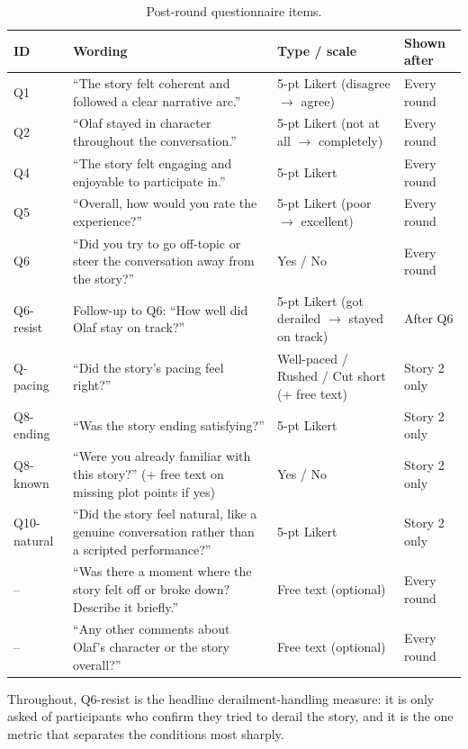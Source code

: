 \documentclass[10pt]{article}
\begin{document}
\begin{table}[htbp]
\centering
\caption{Post-round questionnaire items.}
\label{tab:instrument}
\small
\begin{tabular}{p{1.6cm}p{6.3cm}p{4.2cm}p{2cm}}
\toprule
ID & Wording & Type / scale & Shown after \\
\midrule
Q1 & ``The story felt coherent and followed a clear narrative arc.'' & 5-pt Likert (disagree $\to$ agree) & Every round \\
Q2 & ``Olaf stayed in character throughout the conversation.'' & 5-pt Likert (not at all $\to$ completely) & Every round \\
Q4 & ``The story felt engaging and enjoyable to participate in.'' & 5-pt Likert & Every round \\
Q5 & ``Overall, how would you rate the experience?'' & 5-pt Likert (poor $\to$ excellent) & Every round \\
Q6 & ``Did you try to go off-topic or steer the conversation away from the story?'' & Yes / No & Every round \\
Q6-resist & Follow-up to Q6: ``How well did Olaf stay on track?'' & 5-pt Likert (got derailed $\to$ stayed on track) & After Q6 \\
Q-pacing & ``Did the story's pacing feel right?'' & Well-paced / Rushed / Cut short (+ free text) & Story 2 only \\
Q8-ending & ``Was the story ending satisfying?'' & 5-pt Likert & Story 2 only \\
Q8-known & ``Were you already familiar with this story?'' (+ free text on missing plot points if yes) & Yes / No & Story 2 only \\
Q10-natural & ``Did the story feel natural, like a genuine conversation rather than a scripted performance?'' & 5-pt Likert & Story 2 only \\
-- & ``Was there a moment where the story felt off or broke down? Describe it briefly.'' & Free text (optional) & Every round \\
-- & ``Any other comments about Olaf's character or the story overall?'' & Free text (optional) & Every round \\
\bottomrule
\end{tabular}
\end{table}

Throughout, Q6-resist is the headline derailment-handling measure: it is only asked of participants who confirm they tried to derail the story, and it is the one metric that separates the conditions most sharply.
\end{document}
